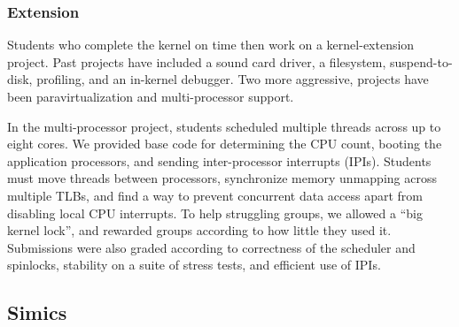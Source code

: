 \subsubsection{\pebbles Extension}

Students who complete the kernel on time
then work on a kernel-extension project.
Past projects have included
a sound card driver,
a filesystem,
suspend-to-disk,
profiling,
and an in-kernel debugger.
Two more aggressive, projects have been
paravirtualization
and multi-processor support.

In the multi-processor project, students
scheduled multiple threads across up to eight cores.
We provided base code for determining the CPU count, booting the application processors, and sending inter-processor interrupts (IPIs).
Students must move threads between processors,
synchronize memory unmapping across multiple TLBs,
and find a way to prevent concurrent data access apart from disabling local CPU interrupts.
%
To help struggling groups,
we allowed
a ``big kernel lock'', and rewarded groups according to how little they used it.
Submissions were also graded according to
correctness of the scheduler and spinlocks,
stability on a suite of stress tests,
and efficient use of IPIs. %


\subsection{Simics}
\label{sec:simics}

